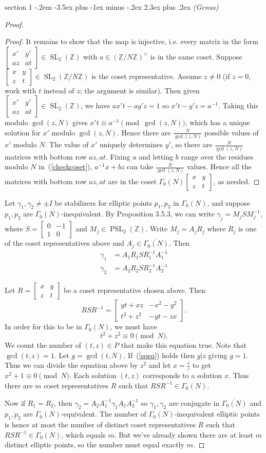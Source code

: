 \documentclass[12pt]{article}
\makeatletter
\theoremstyle{norm}
\newcommand{\Z}[0]{\mathbb{Z}}
\newcommand{\ga}[0]{\gamma}
\newcommand{\Ga}[0]{\Gamma}
\newcommand{\PSL}{\operatorname{PSL}}
\newcommand{\SL}{\operatorname{SL}}
\newcommand{\ol}[1]{\overline{#1}}
\newcommand{\matt}[4]{
\left[
\begin{matrix}
{#1}&{#2}\\
{#3}&{#4}
\end{matrix}
\right]}
\newcommand{\smatt}[4]{
\left[
\begin{smallmatrix}
{#1}&{#2}\\
{#3}&{#4}
\end{smallmatrix}
\right]}
\newenvironment{problem}{\@startsection
       {section}
       {1}
       {-.2em}
       {-3.5ex plus -1ex minus -.2ex}
       {2.3ex plus .2ex}
       {\pagebreak[3]%
       \large\bf\noindent{Problem }
       }
       }
       {%
       }
\makeatother
\begin{document}
\begin{problem}{\it (Genus)}
\begin{proof}
\begin{proof}
It remains to show that the map is injective, i.e. every matrix in the form $\smatt {x'}{y'}{az}{at}\in \SL_2(\Z)$ with $a\in (\Z/N\Z)^{\times}$ is in the same coset. Suppose $\smatt{x}{y}{z}{t}\in \SL_2(\Z/N\Z)$ is the coset representative. Assume $z\neq 0$ (if $z=0$, work with $t$ instead of $z$; the argument is similar).
Then given $\smatt {x'}{y'}{az}{at}\in \SL_2(\Z)$, we have $ax't-ay'z=1$ so $x't-y'z=a^{-1}$. Taking this modulo $\gcd(z,N)$ gives $x't\equiv a^{-1}\pmod{\gcd(z,N)}$, which has a unique solution for $x'$ modulo $\gcd(z,N)$. Hence there are $\frac{N}{\gcd(z,N)}$ possible values of $x'$ modulo $N$. The value of $x'$ uniquely determines $y'$, so there are $\frac{N}{\gcd(z,N)}$ matrices with bottom row $az,at$. 
Fixing $a$ and letting $b$ range over the residues modulo $N$ in~(\ref{checkcoset}), $a^{-1}x+bz$ can take $\frac{N}{\gcd(z,N)}$ values. Hence all the matrices with bottom row $az,at$ are in the coset $\Ga_0(N)\matt{x}{y}zt$, as needed.
\end{proof}
Let $\ga_1,\ga_2\neq \pm I$ be stabilizers for elliptic points $p_1,p_2$ in ${\Ga_0(N)}$, and suppose $p_1,p_2$ are $\Ga_0(N)$-inequivalent. By Proposition 3.5.3, we can write $\ga_j=M_jSM_j^{-1}$, where $S=\smatt 0{-1}{1}0$ and $M_j\in \PSL_2(\Z)$. Write
$M_j=A_jR_j$ where $R_j$ is one of the coset representatives above and $A_j\in \ol{\Ga_0(N)}$. Then
\begin{align*}
\ga_1&=A_1R_1SR_1^{-1}A_1^{-1}\\
\ga_2&=A_2R_2SR_2^{-1}A_2^{-1}
\end{align*}

Let $R=\matt xyzt$ be a coset representative chosen above. Then
\[
RS R^{-1}=\matt{yt+xz}{-x^2-y^2}{t^2+z^2}{-yt-zx}.
\]
In order for this to be in $\Ga_0(N)$, we must have 
\begin{equation}\label{sqeq}
t^2+z^2\equiv 0\pmod N.
\end{equation}
We count the number of $(t,z)\in P$ that make this equation true. Note that $\gcd(t,z)=1$. Let $g=\gcd(t,N)$. If~(\ref{sqeq}) holds then $g|z$ giving $g=1$. Thus we can divide the equation above by $z^2$ and let $x=\frac tz$ to get $x^2+1\equiv 0\pmod N$. Each solution $(t,z)$ corresponds to a solution $x$. Thus there are $m$ coset representatives $R$ such that $RSR^{-1}\in \ol{\Ga_0(N)}$. 

Now if $R_1=R_2$, then $\ga_2=A_2A_1^{-1}\ga_1A_1A_2^{-1}$ so $\ga_1,\ga_2$ are conjugate in $\ol{\Ga_0(N)}$ and $p_1,p_2$ are $\Ga_0(N)$-equivalent. The number of $\Ga_0(N)$-inequivalent elliptic points is hence at most the number of distinct coset representatives $R$ such that $RSR^{-1}\in \Ga_0(N)$, which equals $m$. But we've already shown there are at least $m$ distinct elliptic points, so the number must equal exactly $m$.


\end{proof}
\end{problem}
\end{document}
